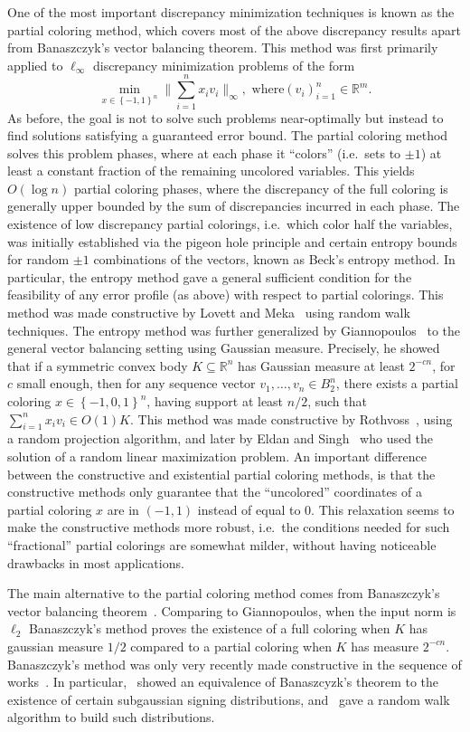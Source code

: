 \documentclass[11pt]{article}
\newcommand{\R}{{\mathbb{R}}}
\newcommand{\set}[1]{\left\{ #1 \right\}}
\begin{document}
One of the most important discrepancy minimization techniques is known as the
partial coloring method, which covers most of the above discrepancy results
apart from Banaszczyk's vector balancing theorem. This method was first
primarily applied to $\ell_\infty$ discrepancy minimization problems of the form
\[
\min_{x \in \set{-1,1}^n} \Big\|\sum_{i=1}^n x_i v_i\Big\|_\infty, \text{ where
} (v_i)_{i=1}^n \in \R^m.
\]
As before, the goal is not to solve such problems near-optimally but instead to find
solutions satisfying a guaranteed error bound. The partial coloring method
solves this problem phases, where at each phase it ``colors'' (i.e.~sets to $\pm
1$) at least a constant fraction of the remaining uncolored variables.  This
yields $O(\log n)$ partial coloring phases, where the discrepancy of the full
coloring is generally upper bounded by the sum of discrepancies incurred in each
phase. The existence of low discrepancy partial colorings, i.e.~which color half
the variables, was initially established via the pigeon hole principle and
certain entropy bounds for random $\pm 1$ combinations of the vectors, known as
Beck's entropy method. In particular, the entropy method gave a general
sufficient condition for the feasibility of any error profile (as above) with
respect to partial colorings. This method was made constructive by Lovett and
Meka~\cite{lovettmeka} using random walk techniques. The entropy method was
further generalized by Giannopoulos~\cite{giann} to the general vector balancing
setting using Gaussian measure. Precisely, he showed that if a symmetric convex
body $K \subseteq \R^n$ has Gaussian measure at least $2^{-c n}$, for
$c$ small enough, then for any sequence vector $v_1,\dots,v_n \in B_2^n$,
there exists a partial coloring $x \in \set{-1,0,1}^n$, having support at least
$n/2$, such that $\sum_{i=1}^n x_i v_i \in O(1) K$. This method was made
constructive by Rothvoss~\cite{rothvoss-giann}, using a random projection
algorithm, and later by Eldan and Singh~\cite{ES14} who used the solution of a
random linear maximization problem. An important difference between the
constructive and existential partial coloring methods, is that the constructive
methods only guarantee that the ``uncolored'' coordinates of a partial coloring
$x$ are in $(-1,1)$ instead of equal to $0$. This relaxation seems to make the
constructive methods more robust, i.e.~the conditions needed for such ``fractional''
partial colorings are somewhat milder, without having noticeable drawbacks in most
applications. 

The main alternative to the partial coloring method comes from Banaszczyk's
vector balancing theorem~\cite{bana}. Comparing to Giannopoulos, when the input
norm is $\ell_2$ Banaszczyk's method proves the existence of a full coloring when
$K$ has gaussian measure $1/2$ compared to a partial coloring when $K$ has measure
$2^{-cn}$.  Banaszczyk's method was only very recently made constructive in
the sequence of works~\cite{BDG16,DGLN16,BDGL18}. In particular,~\cite{DGLN16}
showed an equivalence of Banaszcyzk's theorem to the existence of certain
subgaussian signing distributions, and~\cite{BDGL18} gave a random walk
algorithm to build such distributions.
\end{document}
